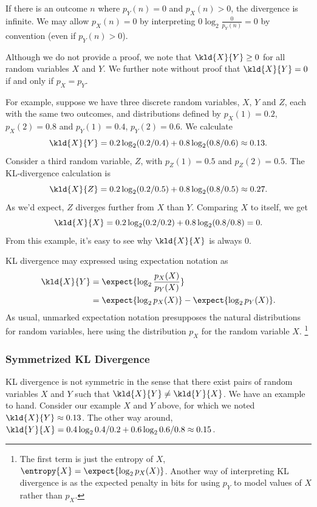 If there is an outcome $n$ where $p_Y(n) = 0$ and $p_X(n) > 0$, the
divergence is infinite.  We may allow $p_X(n) = 0$ by interpreting $0
\log_2 \frac{0}{p_Y(n)} = 0$ by convention (even if $p_Y(n) > 0$).

Although we do not provide a proof, we note that $\kld{X}{Y} \geq 0$
for all random variables $X$ and $Y$.  We further note without proof
that $\kld{X}{Y} = 0$ if and only if $p_X = p_Y$.

For example, suppose we have three discrete random variables, $X$, $Y$
and $Z$, each with the same two outcomes, and distributions defined by
$p_X(1) = 0.2$, $p_X(2) = 0.8$ and $p_Y(1) = 0.4$, $p_Y(2) = 0.6$.  We
calculate 
%
\[
\kld{X}{Y} = 0.2 \log_2 (0.2/0.4) + 0.8 \log_2 (0.8/0.6) \approx 0.13.
\]
%
Consider a third random variable, $Z$, with $p_Z(1) = 0.5$ and
$p_Z(2) = 0.5$.  The KL-divergence calculation is 
%
\[
\kld{X}{Z} = 0.2 \log_2 (0.2/0.5) + 0.8 \log_2 (0.8/0.5) \approx 0.27.
\]
As we'd expect, $Z$ diverges further from $X$ than $Y$.  
Comparing $X$ to itself, we get
%
\[
\kld{X}{X} = 0.2 \log_2 (0.2/0.2) + 0.8 \log_2(0.8/0.8) = 0.
\]  
%
From this example, it's easy to see why $\kld{X}{X}$ is always 0.

KL divergence may expressed using expectation notation as
%
\begin{align}
\kld{X}{Y} 
&= \expect{\log_2 \frac{p_X(X)}{p_Y(X)}}
\\
&= \expect{\log_2 p_X(X)} - \expect{\log_2 p_Y(X)}.
\end{align}
%
As usual, unmarked expectation notation presupposes the natural
distributions for random variables, here using the distribution $p_X$
for the random variable $X$.%
%
\footnote{The first term is just the entropy of $X$,
$\entropy{X} = \expect{\log_2 p_X(X)}$.  Another way of interpreting
KL divergence is as the expected penalty in bits for using $p_Y$ to
model values of $X$ rather than $p_X$.}

\subsubsection{Symmetrized KL Divergence}\label{section:stats-symmetrized-kl-divergence}

KL divergence is not symmetric in the sense that there exist pairs of
random variables $X$ and $Y$ such that $\kld{X}{Y} \neq \kld{Y}{X}$.
We have an example to hand.  Consider our example $X$ and $Y$ above,
for which we noted $\kld{X}{Y} \approx 0.13$.  The other way around,
$\kld{Y}{X} = 0.4 \log_2 0.4/0.2 + 0.6 \log_2 0.6/0.8 \approx 0.15$.

